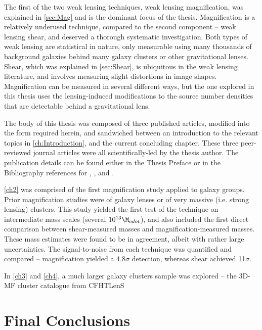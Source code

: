 The first of the two weak lensing techniques, weak lensing magnification, was explained in \autoref{sec:Mag} and is the dominant focus of the thesis. Magnification is a relatively underused technique, compared to the second component -- weak lensing shear, and deserved a thorough systematic investigation. Both types of weak lensing are statistical in nature, only measurable using many thousands of background galaxies behind many galaxy clusters or other gravitational lenses. Shear, which was explained in \autoref{sec:Shear}, is ubiquitous in the weak lensing literature, and involves measuring slight distortions in image shapes. Magnification can be measured in several different ways, but the one explored in this thesis uses the lensing-induced modifications to the source number densities that are detectable behind a gravitational lens.

The body of this thesis was composed of three published articles, modified into the form required herein, and sandwiched between an introduction to the relevant topics in \autoref{ch:Introduction}, and the current concluding chapter. These three peer-reviewed journal articles were all scientifically-led by the thesis author. The publication details can be found either in the Thesis Preface or in the Bibliography references for \citet{Ford12}, \citet{Ford14}, and \citet{Ford15}. 

\autoref{ch2} was comprised of the first magnification study applied to galaxy groups. Prior magnification studies were of galaxy lenses or of very massive (i.e. strong lensing) clusters. This study yielded the first test of the technique on intermediate mass scales (several $10^{13} \M_{odot}$), and also included the first direct comparison between shear-measured masses and magnification-measured masses. These mass estimates were found to be in agreement, albeit with rather large uncertainties. The signal-to-noise from each technique was quantified and compared -- magnification yielded a 4.8$\sigma$ detection, whereas shear achieved 11$\sigma$.

In \autoref{ch3} and \autoref{ch4}, a much larger galaxy clusters sample was explored -- the \ac{3D-MF} cluster catalogue from CFHTLenS


\section{Final Conclusions}
\label{sec:conc}

